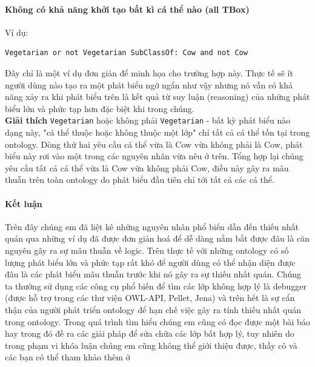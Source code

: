 \paragraph{Không có khả năng khởi tạo bất kì cá thể nào (all TBox)}
Ví dụ:
\begin{verbatim}
Vegetarian or not Vegetarian SubClassOf: Cow and not Cow
\end{verbatim}
Đây chỉ là một ví dụ đơn giản để minh họa cho trường hợp này. Thực tế sẽ ít người dùng nào tạo ra một phát biểu ngớ ngẩn như vậy nhưng nó vẫn có khả năng xảy ra khi phát biểu trên là kết quả từ suy luận (reasoning) của những phát biểu lớn và phức tạp hơn đặc biệt khi trong chúng.
\\
\textbf{Giải thích} \texttt{Vegetarian} hoặc không phải \texttt{Vegetarian} - bất kỳ phát biểu nào dạng này, "cá thể thuộc hoặc không thuộc một lớp" chỉ tất cả cá thể tồn tại trong ontology. Dòng thứ hai yêu cầu cá thể vừa là Cow vừa không phải là Cow, phát biểu này rơi vào một trong các nguyên nhân vừa nêu ở trên. Tổng hợp lại chúng yêu cầu tất cả cá thể vừa là Cow vừa không phải Cow, điều này gây ra mâu thuẫn trên toàn ontology do phát biểu đầu tiên chỉ tới tất cả các cá thể.

\paragraph{Kết luận}
Trên đây chúng em đã liệt kê những nguyên nhân phổ biến dẫn đến thiếu nhất quán qua những ví dụ đã được đơn giản hoá để dễ dàng nắm bắt được đâu là căn nguyên gây ra sự mâu thuẫn về logic. Trên thực tế với những ontology có số lượng phát biểu lớn và phức tạp rất khó để người dùng có thể nhận diện được đâu là các phát biểu mâu thuẫn trước khi nó gây ra sự thiếu nhất quán. Chúng ta thường sử dụng các công cụ phổ biến để tìm các lớp không hợp lý là debugger (được hỗ trợ trong các thư viện OWL-API, Pellet, Jena) và trên hết là sự cẩn thận của người phát triển ontology để hạn chế việc gây ra tính thiếu nhất quán trong ontology. Trong quá trình tìm hiểu chúng em cũng có đọc được  một bài báo hay trong đó đề ra các giải pháp để sửa chữa các lớp bất hợp lý, tuy nhiên do trong phạm vi khóa luận chúng em cũng không thể giới thiệu được, thầy cô và các bạn có thể tham khảo thêm ở \cite{repair}

